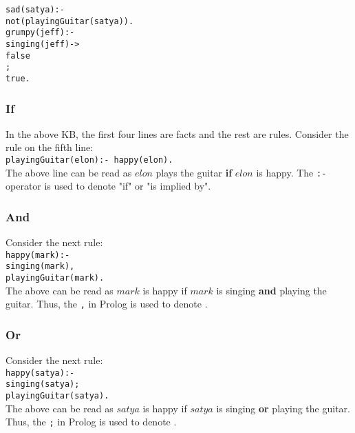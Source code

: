 \documentclass{article}
\newcommand\tab[1][1cm]{\hspace*{#1}}
\begin{document}
\verb|sad(satya):-|\\
\tab \verb|not(playingGuitar(satya)).|\\

\verb|grumpy(jeff):-|\\
\tab \verb|singing(jeff)->|\\
\tab \tab \verb|false|\\
\tab \verb|;|\\
\tab \tab \verb|true.|


\subsubsection{If}
In the above KB, the first four lines are facts and the rest are rules. Consider the rule on the fifth line:\\

\verb|playingGuitar(elon):- happy(elon).|\\

The above line can be read as $elon$ plays the guitar \textbf{if} $elon$ is happy. The \verb|:-| operator is used to denote "if" or "is implied by".

\subsubsection{And}
Consider the next rule:\\

\verb|happy(mark):-|\\
\tab \verb|singing(mark),|\\
\tab \verb|playingGuitar(mark).|\\

The above can be read as $mark$ is happy if $mark$ is singing \textbf{and} playing the guitar. Thus, the \verb|,| in Prolog is used to denote .

\subsubsection{Or}
Consider the next rule:\\

\verb|happy(satya):-|\\
\tab \verb|singing(satya);|\\
\tab \verb|playingGuitar(satya).|\\

The above can be read as $satya$ is happy if $satya$ is singing \textbf{or} playing the guitar. Thus, the \verb|;| in Prolog is used to denote . 
\end{document}
